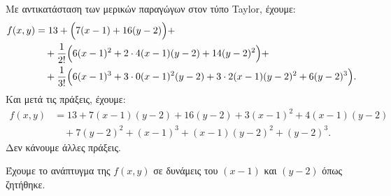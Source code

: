 Με αντικατάσταση των μερικών παραγώγων στον τύπο Taylor, έχουμε:
\begin{equation*}
  \begin{split}
    f(x,y)&=13+\Bigl(7(x-1)+16(y-2)\Bigr)+ \\ 
          &\quad +\frac{1}{2!}\Bigl(6(x-1)^2 +2\cdot 4(x-1)(y-2)+14(y-2)^2\Bigr)+ \\
          &\quad +\frac{1}{3!}\Bigl(6(x-1)^3+3\cdot 0(x-1)^2(y-2)+3\cdot 2(x-1)(y-2)^2+6(y-2)^3\Bigr).
  \end{split}
\end{equation*}
Και μετά τις πράξεις, έχουμε: 
\begin{equation*}
  \begin{split}
    f(x,y)&=13+7(x-1)(y-2)+16(y-2)+3(x-1)^2+4(x-1)(y-2) \\
          &\quad +7(y-2)^2+(x-1)^3+(x-1)(y-2)^2+(y-2)^3.
  \end{split}
\end{equation*}
Δεν κάνουμε άλλες πράξεις.

Έχουμε το ανάπτυγμα της $f(x,y)$ σε δυνάμεις του $(x-1)$ και $(y-2)$ όπως ζητήθηκε.


